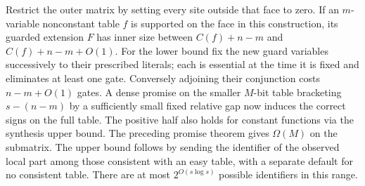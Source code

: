 \documentclass[11pt]{article}
\begin{document}
Restrict the outer matrix by setting every site outside that face to zero. If an $m$-variable nonconstant table $f$ is supported on the face in this construction, its guarded extension $F$ has inner size between $C(f)+n-m$ and $C(f)+n-m+O(1)$. For the lower bound fix the new guard variables successively to their prescribed literals; each is essential at the time it is fixed and eliminates at least one gate. Conversely adjoining their conjunction costs $n-m+O(1)$ gates. A dense promise on the smaller $M$-bit table bracketing $s-(n-m)$ by a sufficiently small fixed relative gap now induces the correct signs on the full table. The positive half also holds for constant functions via the synthesis upper bound. The preceding promise theorem gives $\Omega(M)$ on the submatrix. The upper bound follows by sending the identifier of the observed local part among those consistent with an easy table, with a separate default for no consistent table. There are at most $2^{O(s\log s)}$ possible identifiers in this range.
\end{document}
